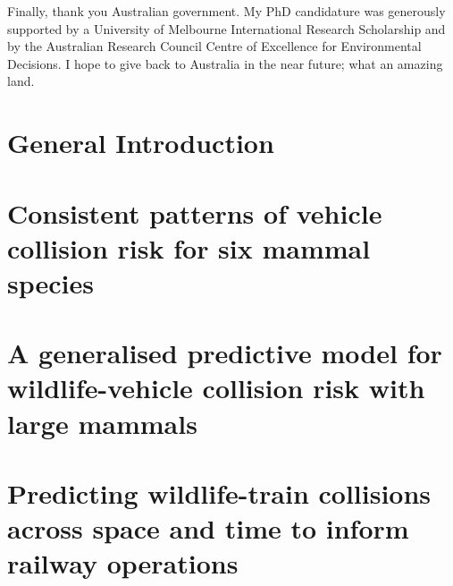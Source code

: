 \documentclass[titlesmallcaps,copyrightpage,examinerscopy]{uomthesis}
\begin{document}
Finally, thank you Australian government. My PhD candidature was generously supported by a University of Melbourne International Research Scholarship and by the Australian Research Council Centre of Excellence for Environmental Decisions. I hope to give back to Australia in the near future; what an amazing land.
\clearpage{\pagestyle{empty}\cleardoublepage}

\tableofcontents
\clearpage{\pagestyle{empty}\cleardoublepage}

\listoffigures
\clearpage{\pagestyle{empty}\cleardoublepage}

\listoftables
\clearpage{\pagestyle{empty}\cleardoublepage}

\mainmatter

%
\chapter{General Introduction}\label{sec:intro}
\clearpage{\pagestyle{empty}\cleardoublepage}


\clearpage{\pagestyle{empty}\cleardoublepage}

%
\chapter{Consistent patterns of vehicle collision risk for six mammal species}\label{sec:6sp}
\clearpage{\pagestyle{empty}\cleardoublepage}

%
\chapter{A generalised predictive model for wildlife-vehicle collision risk with large mammals}\label{sec:cal}
\clearpage{\pagestyle{empty}\cleardoublepage}

%
\chapter{Predicting wildlife-train collisions across space and time to inform railway operations}\label{sec:train}
\clearpage{\pagestyle{empty}\cleardoublepage}
\end{document}
